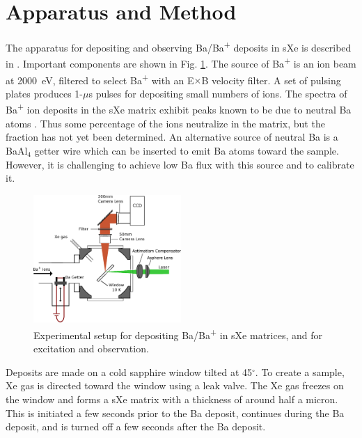 \documentclass[aps,pra,reprint,superscriptaddress]{revtex4-1}
\begin{document}

\section{Apparatus and Method}

The apparatus for depositing and observing Ba/Ba\textsuperscript{+} deposits in sXe is described in \cite{Mong2015}.  Important components are shown in Fig. \ref{fig:apparatus}.  The source of Ba\textsuperscript{+} is an ion beam at 2000~eV, filtered to select Ba\textsuperscript{+} with an E$\times$B velocity filter.  A set of pulsing plates produces 1-$\mu$s pulses for depositing small numbers of ions.  The spectra of Ba\textsuperscript{+} ion deposits in the sXe matrix exhibit peaks known to be due to neutral Ba atoms \cite{Mong2015}.  Thus some percentage of the ions neutralize in the matrix, but the fraction has not yet been determined.  An alternative source of neutral Ba is a BaAl$_{4}$ getter wire which can be inserted to emit Ba atoms toward the sample.  However, it is challenging to achieve low Ba flux with this source and to calibrate it.

\begin{figure}
\includegraphics[width=0.5\textwidth]{figures/cryo_inkscape_chris_full.eps}
\caption{Experimental setup for depositing Ba/Ba\textsuperscript{+} in sXe matrices, and for excitation and observation.}
\label{fig:apparatus}
\end{figure}

Deposits are made on a cold sapphire window tilted at 45$^{\circ}$.  To create a sample, Xe gas is directed toward the window using a leak valve. The Xe gas freezes on the window and forms a sXe matrix with a thickness of around half a micron.  This is initiated a few seconds prior to the Ba deposit, continues during the Ba deposit, and is turned off a few seconds after the Ba deposit.
\end{document}
